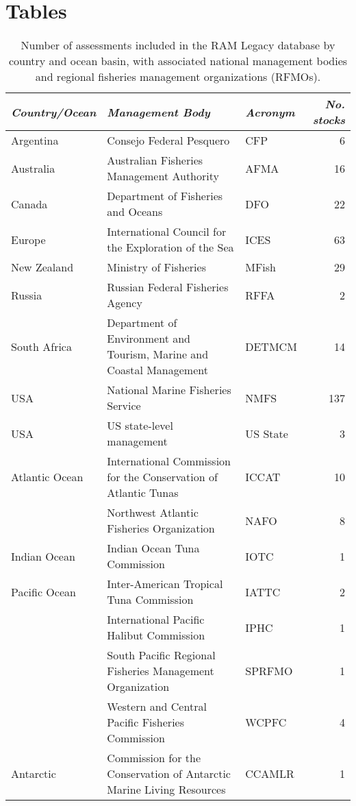 \section*{Tables}


\begin{table}
\caption{Number of assessments included in the RAM Legacy database by
country and ocean basin, with associated national management bodies
and regional fisheries management organizations (RFMOs).}
\begin{tabular}{| l | p{7cm} | l | r |}\label{tab:mgmt}
\textit{Country/Ocean} & \textit{Management Body} & \textit{Acronym} & \textit{No. stocks} \\
\hline \hline
Argentina & Consejo Federal Pesquero & CFP & 6 \\ \hline
Australia & Australian Fisheries Management Authority & AFMA & 16 \\ \hline
Canada & Department of Fisheries and Oceans & DFO & 22 \\ \hline
Europe & International Council for the Exploration of the Sea & ICES & 63 \\ \hline
New Zealand & Ministry of Fisheries & MFish & 29 \\ \hline
Russia & Russian Federal Fisheries Agency & RFFA & 2 \\ \hline
South Africa & Department of Environment and Tourism, Marine and Coastal Management & DETMCM & 14 \\ \hline
USA & National Marine Fisheries Service & NMFS & 137 \\ \hline
USA & US state-level management & US State & 3 \\ \hline
Atlantic Ocean & International Commission for the Conservation of Atlantic Tunas & ICCAT & 10 \\ \hline
 & Northwest Atlantic Fisheries Organization & NAFO & 8 \\ \hline
Indian Ocean & Indian Ocean Tuna Commission & IOTC & 1 \\ \hline
Pacific Ocean & Inter-American Tropical Tuna Commission & IATTC & 2 \\ \hline
 & International Pacific Halibut Commission & IPHC & 1 \\ \hline
 & South Pacific Regional Fisheries Management Organization & SPRFMO & 1 \\ \hline
 & Western and Central Pacific Fisheries Commission & WCPFC & 4 \\ \hline
Antarctic & Commission for the Conservation of Antarctic Marine Living Resources & CCAMLR & 1 \\ \hline
\end{tabular}
\end{table}

